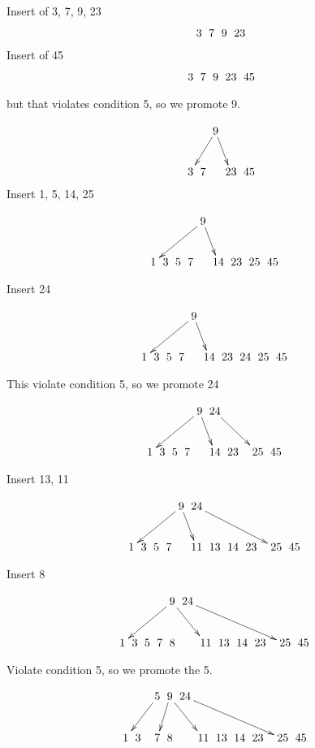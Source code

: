 \documentclass[a4paper]{article}
\begin{document}

Insert of 3, 7, 9, 23
$$\xymatrix @C=0pt {
  &   &   &  3 &  7 &  9 &  23 \\
}$$
Insert of 45
$$\xymatrix @C=0pt {
  &   &   &  3 &  7 &  9 &  23 & 45 \\
}$$

but that violates condition 5, so we promote 9.

$$\xymatrix @C=0pt {
  &   &   &    &    &\ar[dll]  9 \ar[dr] &     &  \\
  &   &   &  3 &  7 &   &  23 & 45 \\
}$$
Insert 1, 5, 14, 25

$$\xymatrix @C=0pt {
  &   &   &    &    &\ar[dllll]  9 \ar[dr] &     &  \\
  & 1 & 3 &  5 &  7 &   &  14 & 23 &  25 & 45 \\
}$$

Insert 24

$$\xymatrix @C=0pt {
  &   &   &    &    &\ar[dllll]  9 \ar[dr] &     &  \\
  & 1 & 3 &  5 &  7 &   &  14 & 23 & 24 & 25 & 45 \\
}$$

This violate condition 5, so we promote 24

$$\xymatrix @C=0pt {
  &   &   &    &    &\ar[dllll]  9 \ar[dr] & 24 \ar[drrr] &  \\
  & 1 & 3 &  5 &  7 &   &  14 & 23 &  & 25 & 45 \\
}$$

Insert 13, 11

$$\xymatrix @C=0pt {
  &   &   &    &    &\ar[dllll]  9 \ar[dr] & 24 \ar[drrrrr] &  \\
  & 1 & 3 &  5 &  7 &   &  11 & 13 & 14 & 23 &  & 25 & 45 \\
}$$

Insert 8

$$\xymatrix @C=0pt {
  &   &   &    &    &\ar[dllll]  9 \ar[drr] & 24 \ar[drrrrrr] &  \\
  & 1 & 3 &  5 &  7 & 8 &   &  11 & 13 & 14 & 23 &  & 25 & 45 \\
}$$

Violate condition 5, so we promote the 5.

$$\xymatrix @C=0pt {
  &   &   &    & \ar[dlll] 5 &\ar[dl]  9 \ar[drr] & 24 \ar[drrrrrr] &  \\
  & 1 & 3 &   &  7 & 8 &   &  11 & 13 & 14 & 23 &  & 25 & 45 \\
}$$
\end{document}
